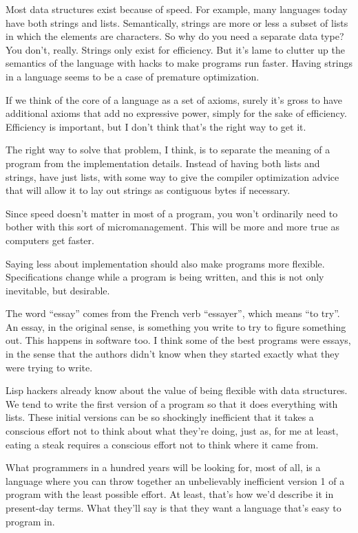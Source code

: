 Most data structures exist because of speed. For example, many languages
today have both strings and lists. Semantically, strings are more or
less a subset of lists in which the elements are characters. So why do
you need a separate data type? You don't, really. Strings only exist for
efficiency. But it's lame to clutter up the semantics of the language
with hacks to make programs run faster. Having strings in a language
seems to be a case of premature optimization.

If we think of the core of a language as a set of axioms, surely it's
gross to have additional axioms that add no expressive power, simply for
the sake of efficiency. Efficiency is important, but I don't think
that's the right way to get it.

The right way to solve that problem, I think, is to separate the meaning
of a program from the implementation details. Instead of having both
lists and strings, have just lists, with some way to give the compiler
optimization advice that will allow it to lay out strings as contiguous
bytes if necessary.

Since speed doesn't matter in most of a program, you won't ordinarily
need to bother with this sort of micromanagement. This will be more and
more true as computers get faster.

Saying less about implementation should also make programs more
flexible. Specifications change while a program is being written, and
this is not only inevitable, but desirable.

The word ``essay'' comes from the French verb ``essayer'', which means
``to try''. An essay, in the original sense, is something you write to
try to figure something out. This happens in software too. I think some
of the best programs were essays, in the sense that the authors didn't
know when they started exactly what they were trying to write.

Lisp hackers already know about the value of being flexible with data
structures. We tend to write the first version of a program so that it
does everything with lists. These initial versions can be so shockingly
inefficient that it takes a conscious effort not to think about what
they're doing, just as, for me at least, eating a steak requires a
conscious effort not to think where it came from.

What programmers in a hundred years will be looking for, most of all, is
a language where you can throw together an unbelievably inefficient
version 1 of a program with the least possible effort. At least, that's
how we'd describe it in present-day terms. What they'll say is that they
want a language that's easy to program in.

